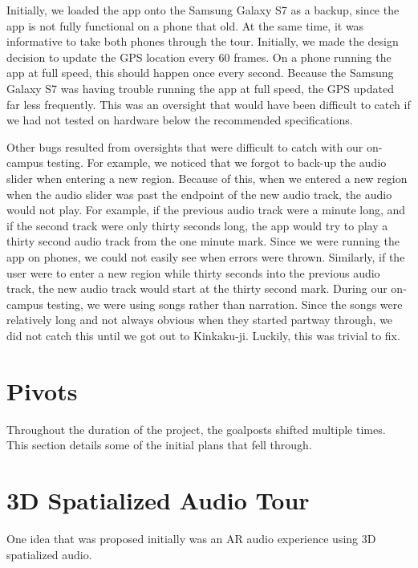 \documentclass[a4paper, 10pt, american, titlepage]{article}
\begin{document}
Initially, we loaded the app onto the Samsung Galaxy S7 as a backup, since the
app is not fully functional on a phone that old. At the same time, it was
informative to take both phones through the tour. Initially, we made the design
decision to update the GPS location every 60 frames. On a phone running the app
at full speed, this should happen once every second. Because the Samsung Galaxy
S7 was having trouble running the app at full speed, the GPS updated far less
frequently. This was an oversight that would have been difficult to catch if we
had not tested on hardware below the recommended specifications.

Other bugs resulted from oversights that were difficult to catch with our
on-campus testing.  For example, we noticed that we forgot to back-up the audio
slider when entering a new region.  Because of this, when we entered a new
region when the audio slider was past the endpoint of the new audio track, the
audio would not play. For example, if the previous audio track were a minute
long, and if the second track were only thirty seconds long, the app would try
to play a thirty second audio track from the one minute mark. Since we were
running the app on phones, we could not easily see when errors were thrown.
Similarly, if the user were to enter a new region while thirty seconds into the
previous audio track, the new audio track would start at the thirty second
mark. During our on-campus testing, we were using songs rather than narration.
Since the songs were relatively long and not always obvious when they started
partway through, we did not catch this until we got out to Kinkaku-ji. Luckily,
this was trivial to fix.

\newpage

\section{Pivots}
\label{sec:pivots}

Throughout the duration of the project, the goalposts shifted multiple times.
This section details some of the initial plans that fell through.

\newpage

\section{3D Spatialized Audio Tour}
\label{sec:3dSpatializedAudioTour}

One idea that was proposed initially was an AR audio experience using 3D
spatialized audio.
\end{document}
